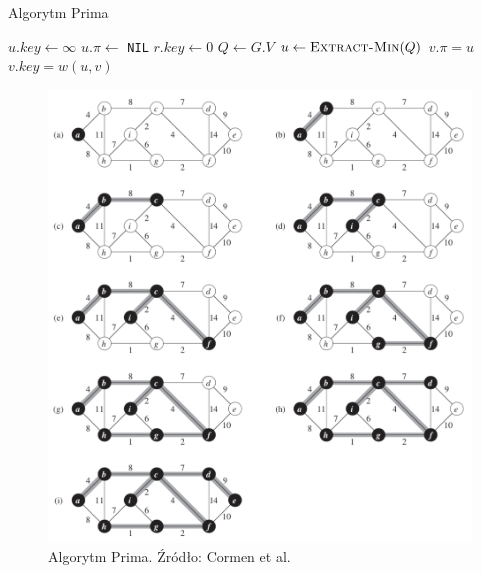 \documentclass[10pt, oneside]{article}
\theoremstyle{remark}
\newcommand{\algcost}[2]{\strut\hfill\makebox[1.5cm][l]{#1}\makebox[4cm][l]{#2}}
\begin{document}
\begin{algorithm}[p]
    \caption{Algorytm Prima}
    \label{alg:mst_prim}
    \begin{algorithmic}[1] %
         \algcost{}{// $O(|E|\log |V|)$}
        			\State $u.key \gets \infty$
        			\State $u.\pi \gets$ \texttt{NIL}
            	\EndFor         
            	\State $r.key \gets 0$
            \State $Q \gets G.V$
            		\State $u \gets \Call{Extract-Min}{Q}$
            				\State $v.\pi = u$
            				\State $v.key = w(u,v)$
            			\EndIf
            		\EndFor
            	\EndWhile
        \EndFunction
    \end{algorithmic}
\end{algorithm}

\begin{figure}[htpb]
	\centering
	\includegraphics[width=.9\textwidth]{figures/prim}
	\caption{Algorytm Prima. Źródło: Cormen et al.}
\end{figure}
\end{document}
